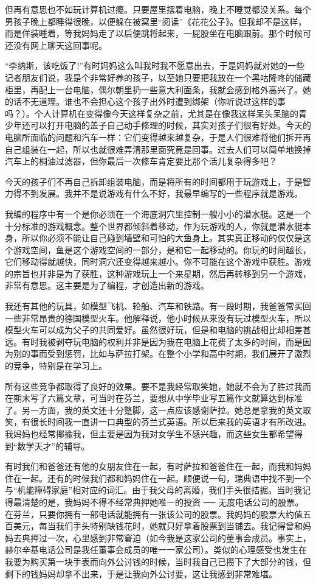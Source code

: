 但再有意思也不如玩计算机过瘾。只要屋里摆着电脑，晚上不睡觉都没关系。每个男孩子晚上都睡得很晚，以便躲在被窝里“阅读”《花花公子》。但我却不是这样，而是佯装睡着，等我妈妈走了以后便跳将起来，一屁股坐在电脑跟前。那个时候可还没有网上聊天这回事呢。

“李纳斯，该吃饭了!”有时妈妈这么叫我时我不愿意出去，于是妈妈就对她的一些记者朋友们说，我是个非常好养的孩子，以至她只要把我放在一个黑咕隆咚的储藏柜里，再配上一台电脑，偶尔朝里扔一些意大利面条，我就会感到格外高兴了。她的话不无道理。谁也不会担心这个孩子出外时遭到绑架（你听说过这样的事吗？）。个人计算机在变得像今天这样复杂之前，尤其是在像我这样呆头呆脑的青少年还可以打开电脑的盖子自己动手修理的时候，其实对孩子们很有好处。今天的电脑所面临的问题和汽车一样：它们变得越来越复杂，于是人们很难将他们拆开再自己组装在一起，所以也就很难弄清那里面究竟是回事。过去人们可以简单地换掉汽车上的桐油过滤器，但你最后一次修车肯定要比那个活儿复杂得多吧？

今天的孩子们不再自己拆卸组装电脑，而是将所有的时间都用于玩游戏上，于是智力得不到发展。我并不是说游戏有什么不好，我最早编写的一些程序就是游戏。

我编的程序中有一个是你必须在一个海底洞穴里控制一艘小小的潜水艇。这是一个十分标准的游戏概念。整个世界都倾斜着移动，作为玩游戏的人，你就是潜水艇本身，所以你必须不能让自己碰到墙壁和可怕的大鱼身上。其实真正移动的仅仅是这个游戏空间，鱼是这个游戏空间的一部分，是和它一起移动的。你玩的时间越长，它们移动得就越快，同时洞穴还变得越来越小。你不可能在这个游戏中获胜。游戏的宗旨也并非是为了获胜，这种游戏玩上一个来星期，然后再转移到另一个游戏，非常有意思。这主要是为了编程，才创造出新的游戏。

我还有其他的玩具，如模型飞机、轮船、汽车和铁路。有一段时期，我爸爸常买回一些非常昂贵的德国模型火车。他解释说，他小时候从来没有玩过模型火车，所以模型火车可以成为父子的共同爱好。虽然很好玩，但是和电脑的挑战相比却相差甚远。有时我被剥夺玩电脑的权利并非是因为我在电脑上花费了太多的时间，而是因为别的事而受到惩罚，比如与萨拉打架。在整个小学和高中时期，我们展开了激烈的竞争，特别是在学习上。

所有这些竞争都取得了良好的效果。要不是我经常取笑她，她就不会为了胜过我而在期末写了六篇文章，可当时在芬兰，要想从中学毕业写五篇作文就算达到标准了。另一方面，我的英文还十分蹩脚，这一点应该感谢萨拉。她总是拿我的英文取笑，有很长时间我一直讲一口典型的芬兰式英语。所以后来我的英语才有所改进。我妈妈也经常揶揄我，但主要是因为我对女学生不感兴趣，而这些女生都希望得到“数学天才”的辅导。

有时我们和爸爸还有他的女朋友住在一起，有时萨拉和爸爸住在一起，而我和妈妈住在一起。还有的时候我们都和妈妈住在一起。顺便说一句，瑞典语中找不到一个与“机能障碍家庭”相对应的词汇。由于我父母的离婚，我们手头很拮据。当时我记得最清楚的是，我妈妈不得不经常典押她唯一的投资 ── 无度电话公司的股票。在芬兰，只要你拥有一部电话就能拥有一张该公司的股票。我妈妈的股票大约值五百美元，每当我们手头特别缺钱花时，她就只好拿着股票到当铺去。我记得曾和妈妈去典押过一次，心里感到非常窘迫（如今我是这家公司的董事会成员。事实上，赫尔辛基电话公司是我任董事会成员的唯一一家公司）。类似的心理感受也发生在我要为购买第一块手表而向外公讨钱的时候，当时我自己已攒下了大部分的钱，但剩下的钱妈妈却拿不出来，于是让我向外公讨要，这让我感到非常难堪。

